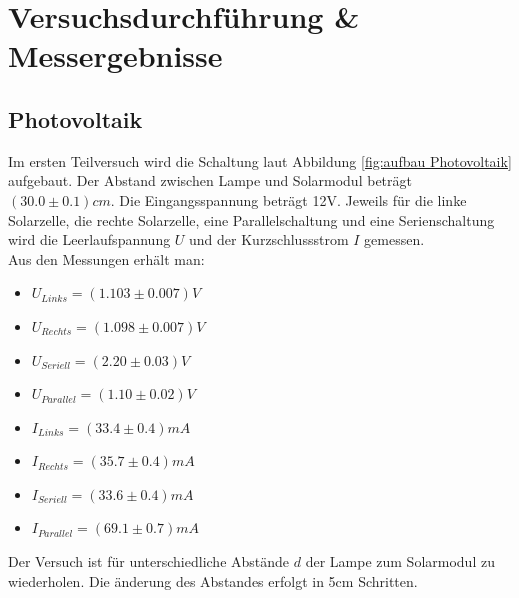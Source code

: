 \documentclass[12pt,a4paper,twoside]{article}
\begin{document}
\section{Versuchsdurchführung \& Messergebnisse} %

\subsection{Photovoltaik}
Im ersten Teilversuch wird die Schaltung laut Abbildung \ref{fig:aufbau Photovoltaik} aufgebaut. Der Abstand zwischen Lampe und Solarmodul beträgt $(30.0 \pm 0.1)cm $. 
Die Eingangsspannung beträgt 12V. 
Jeweils für die linke Solarzelle, die rechte Solarzelle, eine Parallelschaltung und eine Serienschaltung wird die Leerlaufspannung $U$ und der Kurzschlussstrom $I$ gemessen. 
\\
Aus den Messungen erhält man: 
\begin{itemize}
    \item $U_{Links} = (1.103 \pm 0.007)V$
    \item $U_{Rechts} = (1.098 \pm 0.007)V$
    \item $U_{Seriell} = (2.20 \pm 0.03)V$
    \item $U_{Parallel} = (1.10 \pm 0.02)V$
    
    \item $I_{Links} = (33.4 \pm 0.4)mA$
    \item $I_{Rechts} = (35.7 \pm 0.4)mA$
    \item $I_{Seriell} = (33.6 \pm 0.4)mA$
    \item $I_{Parallel} = (69.1 \pm 0.7)mA$
\end{itemize}

\noindent
Der Versuch ist für unterschiedliche Abstände $d$ der Lampe zum Solarmodul zu wiederholen. Die änderung des Abstandes erfolgt in 5cm Schritten. 
\end{document}
